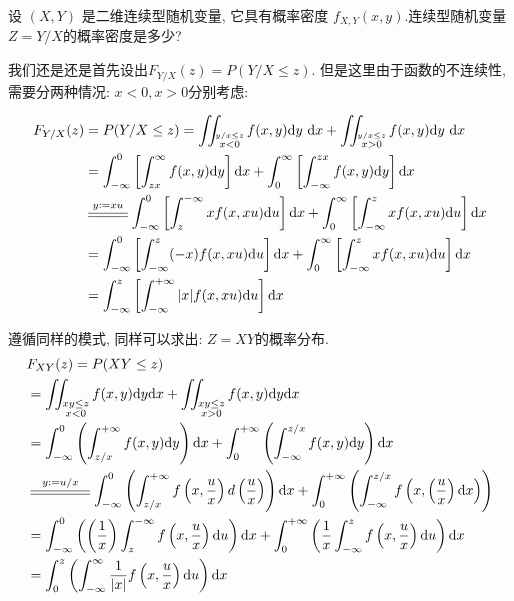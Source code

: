 设 $(X, Y)$ 是二维连续型随机变量, 它具有概率密度 $f_{X,Y}(x, y)$.连续型随机变量$Z=Y/X$的概率密度是多少?

我们还是还是首先设出$F_{Y/X}(z)=P(Y/X\leq z)$. 但是这里由于函数的不连续性, 需要分两种情况: $x<0, x>0$分别考虑:

$$
\begin{aligned}
F_{Y / X}(z) & =P(Y / X \leq z)=\iint_{\stackrel{y / x \leq z}{x<0}} f(x, y) \mathrm{d} y \mathrm{~d} x+\iint_{\stackrel{y / x \leq z}{x>0}} f(x, y) \mathrm{d} y \mathrm{~d} x \\
& =\int_{-\infty}^0\left[\int_{z x}^{\infty} f(x, y) \mathrm{d} y\right] \mathrm{d} x+\int_0^{\infty}\left[\int_{-\infty}^{z x} f(x, y) \mathrm{d} y\right] \mathrm{d} x \\
& \varsub{y:=xu}{1cm} \int_{-\infty}^0\left[\int_z^{-\infty} x f(x, x u) \mathrm{d} u\right] \mathrm{d} x+\int_0^{\infty}\left[\int_{-\infty}^z x f(x, x u) \mathrm{d} u\right] \mathrm{d} x \\
& =\int_{-\infty}^0\left[\int_{-\infty}^z(-x) f(x, x u) \mathrm{d} u\right] \mathrm{d} x+\int_0^{\infty}\left[\int_{-\infty}^z x f(x, x u) \mathrm{d} u\right] \mathrm{d} x \\
& =\int_{-\infty}^z\left[\int_{-\infty}^{+\infty}|x| f(x, x u) \mathrm{d} u\right] \mathrm{d} x
\end{aligned}
$$

遵循同样的模式, 同样可以求出: $Z=XY$的概率分布. 
$$
\begin{aligned} & F_{XY}(z)=P(XY\leq z)\\
 & =\iint_{\substack{xy\leq z\\
 x<0}}f(x,y)\dd y\dd x+\iint_{\substack{xy\leq z\\
 x>0}}f(x,y)\dd y\dd x\\
 & =\int_{-\infty}^{0}\left(\int_{z/x}^{+\infty}f(x,y)\dd y\right)\dd x+\int_{0}^{+\infty}\left(\int_{-\infty}^{z/x}f(x,y)\dd y\right)\dd x\\
 & \varsub{y:=u/x}{1.5cm}\int_{-\infty}^{0}\left(\int_{z/x}^{+\infty}f\left(x,\frac{u}{x}\right)d\left(\frac{u}{x}\right)\right)\dd x+\int_{0}^{+\infty}\left(\int_{-\infty}^{z/x}f\left(x,\left(\frac{u}{x}\right)\dd x\right)\right)\\
 & =\int_{-\infty}^{0}\left(\left(\frac{1}{x}\right)\int_{z}^{-\infty}f\left(x,\frac{u}{x}\right)\dd u\right)\dd x+\int_{0}^{+\infty}\left(\frac{1}{x}\int_{-\infty}^{z}f\left(x,\frac{u}{x}\right)\dd u\right)\dd x\\
 & =\int_{0}^{z}\left(\int_{-\infty}^{\infty}\frac{1}{|x|}f\left(x,\frac{u}{x}\right)\dd u\right)\dd x
\end{aligned}
$$

